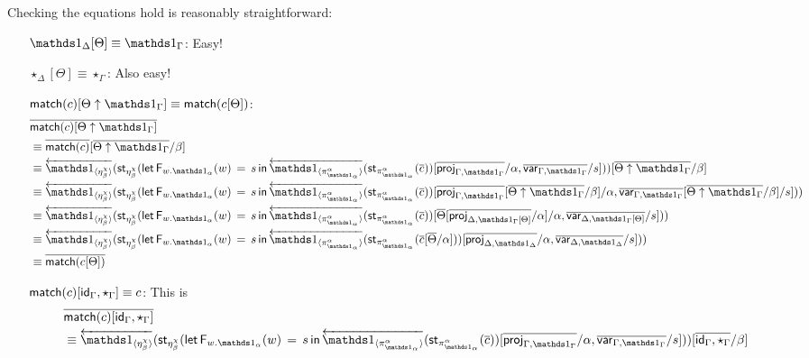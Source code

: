 \documentclass[10pt]{article}
\theoremstyle{definition}
\newcommand{\id}{\mathsf{id}}
\newcommand{\rewrite}[2]{\overleftarrow{#1}(#2)}
\newcommand\StI[2]{\ensuremath{\mathsf{st}_{#1}(#2)}}
\newcommand\FEs[4]{\ensuremath{\mathsf{let} \, \mathsf{F}_{#1}(#3) \, = \, {#2} \, \mathsf{in} \, #4}}
\begin{document}
Checking the equations hold is reasonably straightforward:
\begin{enumerate}[style = multiline, labelwidth = 80pt]
\item[{$\One_\Delta[\Theta] \equiv \One_\Gamma$}:] Easy!
\item[{$\star_\Delta[\Theta] \equiv \star_\Gamma $}:] Also easy!
\item[{$\qunitmatch{c}[\Theta \uparrow \One_\Gamma] \equiv \qunitmatch{c[\Theta]}$}:]
\begin{align*}
&\upstairs{\qunitmatch{c}[\Theta \uparrow \One_\Gamma]} \\
&\equiv \upstairs{\qunitmatch{c}}[\upstairs{\Theta \uparrow \One_\Gamma}/\beta] \\
&\equiv \rewrite{\ApOne{\eta^\chi_\beta}}{\StI{\eta^\chi_\beta}{\FEs{w.\One_\alpha}{s}{w}{\rewrite{\ApOne{\pi^\alpha_{\One_\alpha}}}{\StI{\pi^\alpha_{\One_\alpha}}{\upstairs{c}}}}[\upstairs{\proj{\Gamma, \One_\Gamma}}/\alpha, \upstairs{\qvar{\Gamma, \One_\Gamma}}/s]}}[\upstairs{\Theta \uparrow \One_\Gamma}/\beta] \\
&\equiv \rewrite{\ApOne{\eta^\chi_\beta}}{\StI{\eta^\chi_\beta}{\FEs{w.\One_\alpha}{s}{w}{\rewrite{\ApOne{\pi^\alpha_{\One_\alpha}}}{\StI{\pi^\alpha_{\One_\alpha}}{\upstairs{c}}}}[\upstairs{\proj{\Gamma, \One_\Gamma}}[\upstairs{\Theta \uparrow \One_\Gamma}/\beta]/\alpha, \upstairs{\qvar{\Gamma, \One_\Gamma}}[\upstairs{\Theta \uparrow \One_\Gamma}/\beta]/s]}} \\
&\equiv \rewrite{\ApOne{\eta^\chi_\beta}}{\StI{\eta^\chi_\beta}{\FEs{w.\One_\alpha}{s}{w}{\rewrite{\ApOne{\pi^\alpha_{\One_\alpha}}}{\StI{\pi^\alpha_{\One_\alpha}}{\upstairs{c}}}}[\upstairs{\Theta}[\upstairs{\proj{\Delta, \One_\Gamma[\Theta]}}/\alpha]/\alpha, \upstairs{\qvar{\Delta, \One_\Gamma[\Theta]}}/s]}} \\
&\equiv \rewrite{\ApOne{\eta^\chi_\beta}}{\StI{\eta^\chi_\beta}{\FEs{w.\One_\alpha}{s}{w}{\rewrite{\ApOne{\pi^\alpha_{\One_\alpha}}}{\StI{\pi^\alpha_{\One_\alpha}}{\upstairs{c}[\upstairs{\Theta}/\alpha]}}}[\upstairs{\proj{\Delta, \One_\Delta}}/\alpha, \upstairs{\qvar{\Delta, \One_\Delta}}/s]}} \\
&\equiv \upstairs{\qunitmatch{c[\Theta]}}
\end{align*}
\item[{$\qunitmatch{c}[\id_\Gamma, \star_\Gamma] \equiv c$}:] This is
\begin{align*}
&\upstairs{\qunitmatch{c}[\id_\Gamma, \star_\Gamma]} \\
&\equiv \rewrite{\ApOne{\eta^\chi_\beta}}{\StI{\eta^\chi_\beta}{\FEs{w.\One_\alpha}{s}{w}{\rewrite{\ApOne{\pi^\alpha_{\One_\alpha}}}{\StI{\pi^\alpha_{\One_\alpha}}{\upstairs{c}}}}[\upstairs{\proj{\Gamma, \One_\Gamma}}/\alpha, \upstairs{\qvar{\Gamma, \One_\Gamma}}/s]}}[\upstairs{\id_\Gamma, \star_\Gamma}/\beta] \\

\end{align*}
\end{enumerate}
\end{document}
